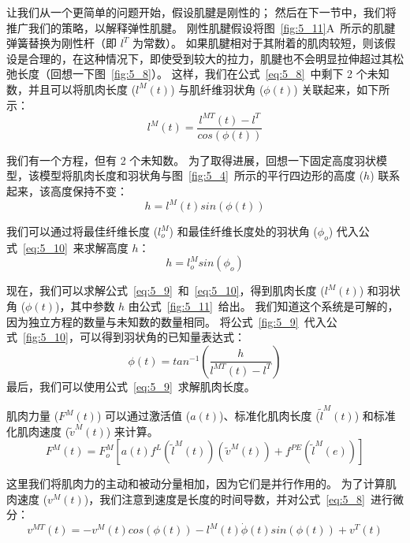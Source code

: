 让我们从一个更简单的问题开始，假设肌腱是刚性的；
然后在下一节中，我们将推广我们的策略，以解释弹性肌腱。
刚性肌腱假设将图~\ref{fig:5_11}A~所示的肌腱弹簧替换为刚性杆（即 $l^T$ 为常数）。
如果肌腱相对于其附着的肌肉较短，则该假设是合理的，在这种情况下，即使受到较大的拉力，肌腱也不会明显拉伸超过其松弛长度（回想一下图~\ref{fig:5_8}）。
这样，我们在公式~\ref{eq:5_8}~中剩下 2 个未知数，并且可以将肌肉长度 ($l^M(t)$) 与肌纤维羽状角 ($\phi(t)$) 关联起来，如下所示：
%
\begin{equation}
	l^M(t) = \frac{
				l^{MT}(t) - l^T
			}{
				cos(\phi(t))
			}
	\label{eq:5_9}
\end{equation}

我们有一个方程，但有 2 个未知数。
为了取得进展，回想一下固定高度羽状模型，该模型将肌肉长度和羽状角与图~\ref{fig:5_4}~所示的平行四边形的高度 ($h$) 联系起来，该高度保持不变：
%
\begin{equation}
	h = l^M(t) sin(\phi(t))
	\label{eq:5_10}
\end{equation}

我们可以通过将最佳纤维长度 ($l_o^M$) 和最佳纤维长度处的羽状角 ($\phi_o$) 代入公式~\ref{eq:5_10}~来求解高度 $h$：
%
\begin{equation}
	h = l_o^M sin(\phi_o)
	\label{eq:5_11}
\end{equation}


现在，我们可以求解公式~\ref{eq:5_9}~和~\ref{eq:5_10}，得到肌肉长度 ($l^M(t)$) 和羽状角 ($\phi(t)$)，其中参数 $h$ 由公式~\ref{fig:5_11}~给出。
我们知道这个系统是可解的，因为独立方程的数量与未知数的数量相同。
将公式~\ref{fig:5_9}~代入公式~\ref{fig:5_10}，可以得到羽状角的已知量表达式：
%
\begin{equation}
	\phi(t) = tan^{-1} (
				\frac{h}{
					l^{MT}(t) - l^T
				}
			)
	\label{eq:5_12}
\end{equation}
最后，我们可以使用公式~\ref{eq:5_9}~求解肌肉长度。


肌肉力量 ($F^M(t)$) 可以通过激活值 ($a(t)$)、标准化肌肉长度 ($\tilde{l}^M (t)$) 和标准化肌肉速度 ($\tilde{v} ^M (t)$) 来计算。
%
\begin{equation}
	F^M (t) = 
			F_o^M
			[
				a(t) f^L(\tilde{l}^M (t)) (\tilde{v}^M (t)) 
				+ f^{PE}(\tilde{l}^M (e))
			]
	\label{eq:5_13}
\end{equation}


这里我们将肌肉力的主动和被动分量相加，因为它们是并行作用的。
为了计算肌肉速度 ($v^M (t)$)，我们注意到速度是长度的时间导数，并对公式~\ref{eq:5_8}~进行微分：
%
\begin{equation}
	v^{MT} (t) = - v^M(t) cos( \phi(t) )
				 - l^M(t) \dot{\phi}(t) sin( \phi (t) )
				 + v^T (t)
	\label{eq:5_14}
\end{equation}


